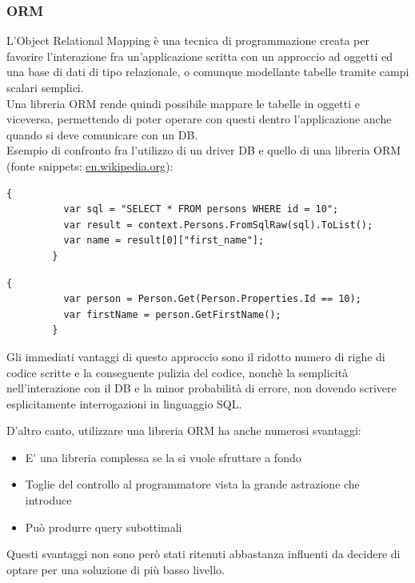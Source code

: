 \documentclass[a4paper, 12pt]{report}
\begin{document}
    \subsubsection*{ORM}
      L'Object Relational Mapping è una tecnica di programmazione creata per favorire l'interazione fra un'applicazione scritta con un approccio ad oggetti ed una base di dati di tipo relazionale, o comunque modellante tabelle tramite campi scalari semplici.\\
      Una libreria ORM rende quindi possibile mappare le tabelle in oggetti e viceversa, permettendo di poter operare con questi dentro l'applicazione anche quando si deve comunicare con un DB.\\
      
      Esempio di confronto fra l'utilizzo di un driver DB e quello di una libreria ORM (fonte snippets: \href{https://en.wikipedia.org/wiki/Object%E2%80%93relational_mapping}{en.wikipedia.org}):
      \begin{Verbatim}[samepage=true]
        {
          var sql = "SELECT * FROM persons WHERE id = 10";
          var result = context.Persons.FromSqlRaw(sql).ToList();
          var name = result[0]["first_name"];
        }
      \end{Verbatim}
      \begin{Verbatim}[samepage=true]
        {
          var person = Person.Get(Person.Properties.Id == 10);
          var firstName = person.GetFirstName();
        }
      \end{Verbatim}

      Gli immediati vantaggi di questo approccio sono il ridotto numero di righe di codice scritte e la conseguente pulizia del codice, nonchè la semplicità nell'interazione con il DB e la minor probabilità di errore, non dovendo scrivere esplicitamente interrogazioni in linguaggio SQL.

      D'altro canto, utilizzare una libreria ORM ha anche numerosi svantaggi:
      \begin{itemize}
        \item E' una libreria complessa se la si vuole sfruttare a fondo
        \item Toglie del controllo al programmatore vista la grande astrazione che introduce
        \item Può produrre query subottimali
      \end{itemize}
      Questi svantaggi non sono però stati ritenuti abbastanza influenti da decidere di optare per una soluzione di più basso livello.\\
    \newpage
\end{document}
